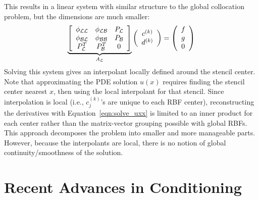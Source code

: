 \documentclass[11pt]{report}
\begin{document}
{This results in a linear system with similar structure to the global collocation problem, but the dimensions are much smaller:
\begin{eqnarray}
\underbrace{\left[ \begin{array}{c c c} 
	\phi_{\mathcal{L}\mathcal{L}} & \phi_{\mathcal{L}\mathcal{B}} & P_{\mathcal{L}} \\
	\phi_{\mathcal{B}\mathcal{L}} & \phi_{\mathcal{B}\mathcal{B}} & P_{\mathcal{B}} \\
	P^T_{\mathcal{L}} & P^T_{\mathcal{B}} & 0 \\
	\end{array} \right]}_{A_{\mathcal{L}}} \left( \begin{array}{c}
							{c}^{(k)} \\
							{d}^{(k)}
							 \end{array}
						 \right) = \left( \begin{array}{c}
							{f} \\
							{g} \\
							0
							 \end{array}
						 \right) 
	\label{eqn:local_method}
\end{eqnarray}
Solving this system gives an interpolant locally defined around the stencil center. Note that approximating the PDE solution $u(x)$ requires finding the stencil center nearest $x$, then using the local interpolant for that stencil. Since interpolation is local (i.e., $c_j^{(k)}$'s are unique to each RBF center), reconstructing the derivatives with Equation~\ref{eqn:solve_uxx} is limited to an inner product for each center rather than the matrix-vector grouping possible with global RBFs.  
This approach decomposes the problem into smaller and more manageable parts. However, because the interpolants are local, there is no notion of global continuity/smoothness of the solution. 



\section{Recent Advances in Conditioning}

}
\end{document}
